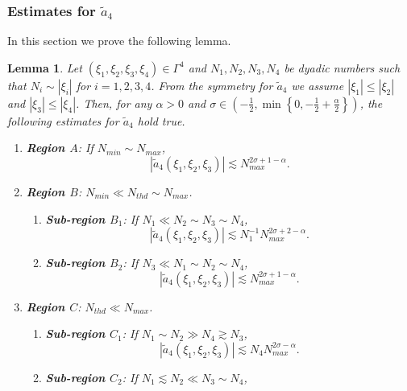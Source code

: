 \documentclass{amsart}
\newtheorem{lemma}[theorem]{Lemma}
\theoremstyle{definition}
\theoremstyle{remark}
\numberwithin{equation}{section}
\begin{document}
\subsubsection{Estimates for $\widetilde{a}_4$}
In this section we prove the following lemma.
\begin{lemma}\label{lem:a4tilde}
  Let $(\xi_1,\xi_2,\xi_3,\xi_4) \in \Gamma^4$ and $N_1, N_2, N_3, N_4$ be dyadic numbers such that $N_i\sim |\xi_i|$ for $i=1,2,3,4$. From the symmetry for $\widetilde{a}_4$ we assume $|\xi_1|\le |\xi_2|$ and $|\xi_3|\le |\xi_4|$. Then, for any  $\alpha>0$ and $\sigma\in \left(-\frac 12, \min\left\{0, -\frac 12+\frac{\alpha}2\right\} \right)$, the following estimates for $\widetilde{a}_4$ hold true.
  \begin{enumerate}
    \item {\bf Region $A$}: If $N_{min} \sim N_{max}$,
    \begin{equation}\label{a4tilde-A}
      |\widetilde{a}_4(\xi_1,\xi_2,\xi_3)| \lesssim N_{max}^{2\sigma+1-\alpha} .
    \end{equation}
    \item {\bf Region $B$}: $N_{min}\ll N_{thd}\sim N_{max}$.
    \begin{enumerate}
      \item {\bf Sub-region $B_1$}: If $N_1\ll N_2\sim N_3\sim N_4$,
      \begin{equation}\label{a4tilde-B1}
      |\widetilde{a}_4(\xi_1,\xi_2,\xi_3)| \lesssim N_1^{-1} N_{max}^{2\sigma+2-\alpha} .
    \end{equation}
    \item {\bf Sub-region $B_2$}: If $N_3\ll N_1\sim N_2\sim N_4$,
      \begin{equation}\label{a4tilde-B2}
      |\widetilde{a}_4(\xi_1,\xi_2,\xi_3)| \lesssim N_{max}^{2\sigma+1-\alpha} .
    \end{equation}
    \end{enumerate}
    \item {\bf Region $C$}: $N_{thd} \ll N_{max}$.
    \begin{enumerate}
      \item {\bf Sub-region $C_1$}: If $N_1\sim N_2\gg N_4\gtrsim N_3$,
       \begin{equation}\label{a4tilde-C1}
      |\widetilde{a}_4(\xi_1,\xi_2,\xi_3)| \lesssim N_4 N_{max}^{2\sigma-\alpha} .
    \end{equation}
     \item {\bf Sub-region $C_2$}: If $N_1\lesssim N_2\ll N_3\sim N_4$,
       \begin{equation}\label{a4tilde-C2}

\end{equation}
\end{enumerate}
\end{enumerate}
\end{lemma}
\end{document}
